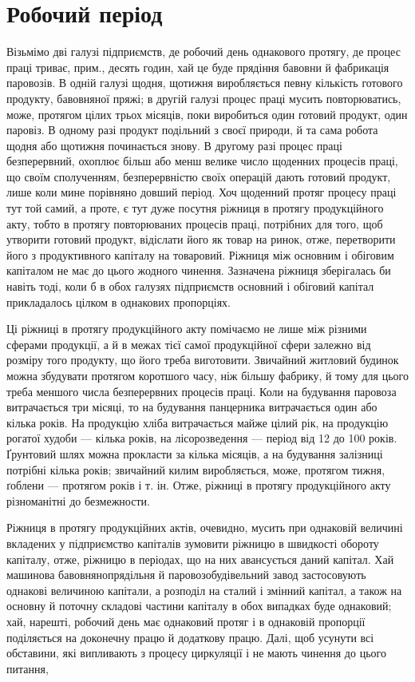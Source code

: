 \section{Робочий період}

Візьмімо дві галузі підприємств, де робочий день однакового протягу,
де процес праці триває, прим., десять годин, хай це буде прядіння
бавовни й фабрикація паровозів. В одній галузі щодня, щотижня виробляється
певну кількість готового продукту, бавовняної пряжі; в другій
галузі процес праці мусить повторюватись, може, протягом цілих трьох
місяців, поки виробиться один готовий продукт, один паровіз. В одному
разі продукт подільний з своєї природи, й та сама робота щодня або
щотижня починається знову. В другому разі процес праці безперервний,
охоплює більш або менш велике число щоденних процесів праці, що своїм
сполученням, безперервністю своїх операцій дають готовий продукт, лише
коли мине порівняно довший період. Хоч щоденний протяг процесу праці
тут той самий, а проте, є тут дуже посутня ріжниця в протягу продукційного
акту, тобто в протягу повторюваних процесів праці, потрібних
для того, щоб утворити готовий продукт, відіслати його як товар на
ринок, отже, перетворити його з продуктивного капіталу на товаровий.
Ріжниця між основним і обіговим капіталом не має до цього жодного
чинення. Зазначена ріжниця зберігалась би навіть тоді, коли б в обох
галузях підприємств основний і обіговий капітал прикладалось цілком
в однакових пропорціях.

Ці ріжниці в протягу продукційного акту помічаємо не лише між
різними сферами продукції, а й в межах тієї самої продукційної сфери
залежно від розміру того продукту, що його треба виготовити. Звичайний
житловий будинок можна збудувати протягом коротшого часу,
ніж більшу фабрику, й тому для цього треба меншого числа безперервних
процесів праці. Коли на будування паровоза витрачається три місяці,
то на будування панцерника витрачається один або кілька років. На продукцію
хліба витрачається майже цілий рік, на продукцію рогатої худоби
— кілька років, на лісорозведення — період від 12 до 100 років. Ґрунтовий
шлях можна прокласти за кілька місяців, а на будування залізниці
потрібні кілька років; звичайний килим виробляється, може, протягом
тижня, ґоблени — протягом років і т. ін. Отже, ріжниці в протягу продукційного
акту різноманітні до безмежности.

Ріжниця в протягу продукційних актів, очевидно, мусить при однаковій
величині вкладених у підприємство капіталів зумовити ріжницю в
швидкості обороту капіталу, отже, ріжницю в періодах, що на них авансується
даний капітал. Хай машинова бавовнянопрядільня й паровозобудівельний
завод застосовують однакові величиною капітали, а розподіл
на сталий і змінний капітал, а також на основну й поточну складові частини
капіталу в обох випадках буде однаковий; хай, нарешті, робочий
день має однаковий протяг і в однаковій пропорції поділяється на доконечну
працю й додаткову працю. Далі, щоб усунути всі обставини, які
випливають з процесу циркуляції і не мають чинення до цього питання,
\parbreak{}  %
